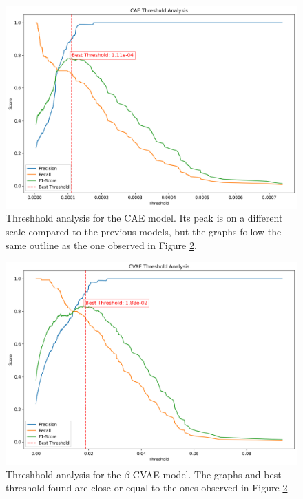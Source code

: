 \begin{figure}[!h]
  \centering
  \includegraphics[scale=0.4]{figures/anomalies/cae/threshold_True.png}
  \caption{Threshhold analysis for the CAE model. Its peak is on a different scale compared to the previous models, but the graphs follow the same outline as the one observed in Figure \ref{fig:threshold_vae}.}
  \label{fig:threshold_cae}
\end{figure}

\begin{figure}[!h]
  \centering
  \includegraphics[scale=0.4]{figures/anomalies/cvae/threshold_True.png}
  \caption{Threshhold analysis for the $\beta$-CVAE model. The graphs and best threshold found are close or equal to the ones observed in Figure \ref{fig:threshold_vae}.}
  \label{fig:threshold_vae}
\end{figure}